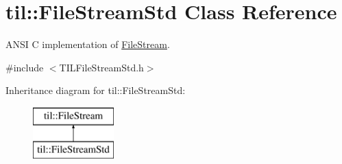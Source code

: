 \hypertarget{classtil_1_1_file_stream_std}{
\section{til::FileStreamStd Class Reference}
\label{classtil_1_1_file_stream_std}
}


ANSI C implementation of \hyperlink{classtil_1_1_file_stream}{FileStream}.  




{\ttfamily \#include $<$TILFileStreamStd.h$>$}

Inheritance diagram for til::FileStreamStd:\begin{figure}[H]
\begin{center}
\leavevmode
\includegraphics[height=2.000000cm]{classtil_1_1_file_stream_std}
\end{center}
\end{figure}
